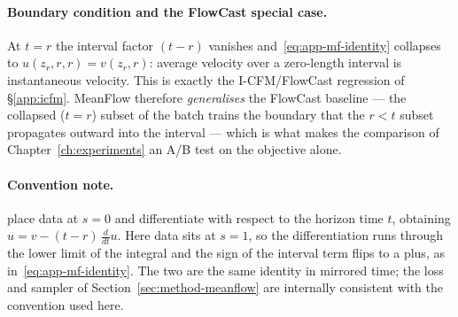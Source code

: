 \paragraph{Boundary condition and the FlowCast special case.} At $t = r$ the interval factor $(t - r)$ vanishes and~\eqref{eq:app-mf-identity} collapses to $u(z_r, r, r) = v(z_r, r)$: average velocity over a zero-length interval is instantaneous velocity. This is exactly the I-CFM/FlowCast regression of \S\ref{app:icfm}. MeanFlow therefore \emph{generalises} the FlowCast baseline --- the collapsed ($t = r$) subset of the batch trains the boundary that the $r < t$ subset propagates outward into the interval --- which is what makes the comparison of Chapter~\ref{ch:experiments} an A/B test on the objective alone.

\paragraph{Convention note.} \citet{geng2025meanflow} place data at $s = 0$ and differentiate with respect to the horizon time $t$, obtaining $u = v - (t - r)\,\tfrac{d}{dt}u$. Here data sits at $s = 1$, so the differentiation runs through the lower limit of the integral and the sign of the interval term flips to a plus, as in~\eqref{eq:app-mf-identity}. The two are the same identity in mirrored time; the loss and sampler of Section~\ref{sec:method-meanflow} are internally consistent with the convention used here.
